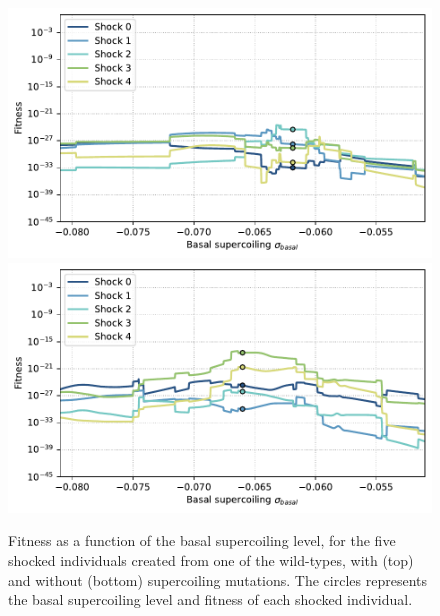 \begin{figure}
\centering
\includegraphics[width=\textwidth]{epistasis/img/with-sc/fitness_landscapes_shuffled_wt_01.pdf}
\includegraphics[width=\textwidth]{epistasis/img/control/fitness_landscapes_shuffled_wt_01.pdf}
\caption[Supercoiling fitness landscapes after an environmental shock, with and without supercoiling mutations]{Fitness as a function of the basal supercoiling level, for the five shocked individuals created from one of the wild-types, with (top) and without (bottom) supercoiling mutations.
The circles represents the basal supercoiling level and fitness of each shocked individual.}
\label{fig:epistasis:fitness-landscapes-shock}
\end{figure}

